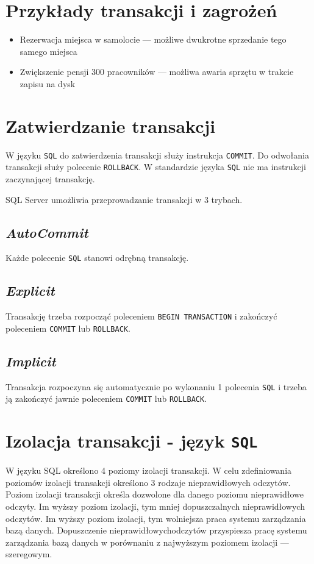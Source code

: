 \documentclass{article}
\begin{document}
\section{Przykłady transakcji i zagrożeń}
\begin{itemize}
    \item Rezerwacja miejsca w samolocie --- możliwe dwukrotne sprzedanie tego samego miejsca
    \item Zwiększenie pensji 300 pracowników --- możliwa awaria sprzętu w trakcie zapisu na dysk
\end{itemize}
\section{Zatwierdzanie transakcji}
W języku {\tt SQL} do zatwierdzenia transakcji służy instrukcja {\tt COMMIT}.
Do odwołania transakcji służy polecenie {\tt ROLLBACK}.
W standardzie języka {\tt SQL} nie ma instrukcji zaczynającej transakcję.

SQL Server umożliwia przeprowadzanie transakcji w 3 trybach.
\subsection{\em AutoCommit}
Każde polecenie {\tt SQL} stanowi odrębną transakcję.
\subsection{\em Explicit}
Transakcję trzeba rozpocząć poleceniem \texttt{BEGIN TRANSACTION} i zakończyć poleceniem \texttt{COMMIT} lub \texttt{ROLLBACK}.
\subsection{\em Implicit}
Transakcja rozpoczyna się automatycznie po wykonaniu 1 polecenia {\tt SQL} i trzeba ją zakończyć jawnie poleceniem \texttt{COMMIT} lub \texttt{ROLLBACK}.
\pagebreak
\section{Izolacja transakcji - język {\tt SQL}}
W języku SQL określono 4 poziomy izolacji transakcji.
W celu zdefiniowania poziomów izolacji transakcji określono 3 rodzaje nieprawidłowych odczytów.
Poziom izolacji transakcji określa dozwolone dla danego poziomu nieprawidłowe odczyty.
Im wyższy poziom izolacji, tym mniej dopuszczalnych nieprawidłowych odczytów.
Im wyższy poziom izolacji, tym wolniejsza praca systemu zarządzania bazą danych.
Dopuszczenie nieprawidłowychodczytów przyspiesza pracę systemu zarządzania bazą danych w porównaniu z najwyższym poziomem izolacji --- szeregowym.
\end{document}
